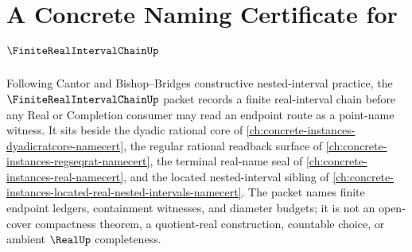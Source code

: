 \chapter{A Concrete Naming Certificate for $\FiniteRealIntervalChainUp$}
\label{ch:concrete-instances-finite-real-interval-chain-namecert}

Following Cantor and Bishop--Bridges constructive nested-interval practice, the $\FiniteRealIntervalChainUp$ packet records a finite real-interval chain before any Real or Completion consumer may read an endpoint route as a point-name witness. It sits beside the dyadic rational core of \autoref{ch:concrete-instances-dyadicratcore-namecert}, the regular rational readback surface of \autoref{ch:concrete-instances-regseqrat-namecert}, the terminal real-name seal of \autoref{ch:concrete-instances-real-namecert}, and the located nested-interval sibling of \autoref{ch:concrete-instances-located-real-nested-intervals-namecert}. The packet names finite endpoint ledgers, containment witnesses, and diameter budgets; it is not an open-cover compactness theorem, a quotient-real construction, countable choice, or ambient $\RealUp$ completeness.

